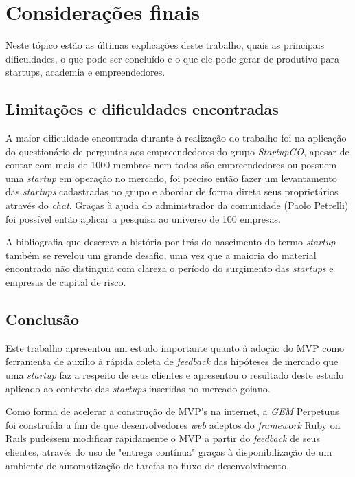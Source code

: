 \chapter{Considera\c{c}\~oes finais}

Neste t\'opico est\~ao as \'ultimas explica\c{c}\~oes deste trabalho, quais as principais dificuldades, o que pode ser conclu\'ido e o que ele pode gerar de produtivo para startups, academia e empreendedores.

\section{Limita\c{c}\~oes e dificuldades encontradas}

A maior dificuldade encontrada durante \`a realiza\c{c}\~ao do trabalho foi na aplica\c{c}\~ao do question\'ario de perguntas aos empreendedores do grupo \emph{StartupGO}, apesar de contar com mais de 1000 membros nem todos s\~ao empreendedores ou possuem uma \emph{startup} em opera\c{c}\~ao no mercado, foi preciso ent\~ao fazer um levantamento das \emph{startups} cadastradas no grupo e abordar de forma direta seus propriet\'arios atrav\'es do \emph{chat}. Gra\c{c}as \`a ajuda do administrador da comunidade (Paolo Petrelli) foi poss\'ivel ent\~ao aplicar a pesquisa ao universo de 100 empresas.

A bibliografia que descreve a hist\'oria por tr\'as do nascimento do termo \emph{startup} tamb\'em se revelou um grande desafio, uma vez que a maioria do material encontrado n\~ao distinguia com clareza o per\'iodo do surgimento das \emph{startups} e empresas de capital de risco.

\section{Conclus\~ao}

Este trabalho apresentou um estudo importante quanto \`a ado\c{c}\~ao do MVP como ferramenta de aux\'ilio \`a r\'apida coleta de \emph{feedback} das hip\'oteses de mercado que uma \emph{startup} faz a respeito de seus clientes e apresentou o resultado deste estudo aplicado ao contexto das \emph{startups} inseridas no mercado goiano.

Como forma de acelerar a constru\c{c}\~ao de MVP's na internet, a \emph{GEM} Perpetuus foi constru\'ida a fim de que desenvolvedores \emph{web} adeptos do \emph{framework} Ruby on Rails pudessem modificar rapidamente o MVP a partir do \emph{feedback} de seus clientes, atrav\'es do uso de "entrega cont\'inua" gra\c{c}as \`a disponibiliza\c{c}\~ao de um ambiente de automatiza\c{c}\~ao de tarefas no fluxo de desenvolvimento.

